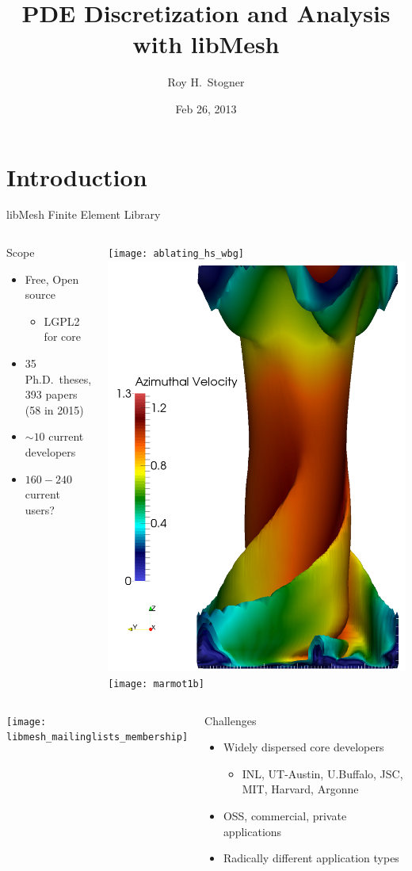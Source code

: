 \documentclass[mathserif]{beamer}
\date{Feb 26, 2013}
\author{Roy H.~Stogner\inst{1}}
\institute{\inst{1}The University of Texas at Austin}
\title[libMesh]{PDE Discretization and Analysis with libMesh}
\begin{document}
\begin{frame}
\titlepage
\end{frame}


\section{Introduction}


\begin{frame}{libMesh Finite Element Library}
\begin{columns}
\begin{block}{Scope}
\begin{itemize}
\item Free, Open source
\begin{itemize}
\item LGPL2 for core
\end{itemize}
\item 35 Ph.D.\ theses, 393 papers (58 in 2015)
\item $\sim10$ current developers
\item $160-240$ current users?
\end{itemize}
\end{block}

\texttt{[image: ablating\_hs\_wbg]}
\includegraphics[width=.25\textwidth]{sov}
\texttt{[image: marmot1b]}
\end{columns}

\begin{columns}
\texttt{[image: libmesh\_mailinglists\_membership]}

\begin{block}{Challenges}
\begin{itemize}
\item Widely dispersed core developers
\begin{itemize}
\item INL, UT-Austin, U.Buffalo, JSC, MIT, Harvard, Argonne
\end{itemize}
\item OSS, commercial, private applications
\item Radically different application types
\end{itemize}
\end{block}
\end{columns}


\end{frame}
\end{document}
